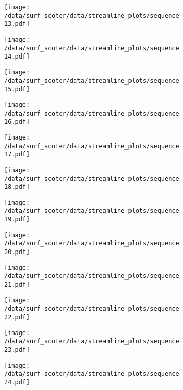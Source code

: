 \begin{figure}[h]
	\begin{subfigure}[t]{0.5\textwidth}
		\centering
		\texttt{[image: /data/surf\_scoter/data/streamline\_plots/sequence13.pdf]}
	\end{subfigure}%
	\begin{subfigure}[t]{0.5\textwidth}
		\centering
		\texttt{[image: /data/surf\_scoter/data/streamline\_plots/sequence14.pdf]}
	\end{subfigure}
	\begin{subfigure}[t]{0.5\textwidth}
		\centering
		\texttt{[image: /data/surf\_scoter/data/streamline\_plots/sequence15.pdf]}
	\end{subfigure}%
	\begin{subfigure}[t]{0.5\textwidth}
		\centering
		\texttt{[image: /data/surf\_scoter/data/streamline\_plots/sequence16.pdf]}
	\end{subfigure}
	\begin{subfigure}[t]{0.5\textwidth}
		\centering
		\texttt{[image: /data/surf\_scoter/data/streamline\_plots/sequence17.pdf]}
	\end{subfigure}%
	\begin{subfigure}[t]{0.5\textwidth}
		\centering
		\texttt{[image: /data/surf\_scoter/data/streamline\_plots/sequence18.pdf]}
	\end{subfigure}
\end{figure}

\begin{figure}[h]
	\begin{subfigure}[t]{0.5\textwidth}
		\centering
		\texttt{[image: /data/surf\_scoter/data/streamline\_plots/sequence19.pdf]}
	\end{subfigure}%
	\begin{subfigure}[t]{0.5\textwidth}
		\centering
		\texttt{[image: /data/surf\_scoter/data/streamline\_plots/sequence20.pdf]}
	\end{subfigure}
	\begin{subfigure}[t]{0.5\textwidth}
		\centering
		\texttt{[image: /data/surf\_scoter/data/streamline\_plots/sequence21.pdf]}
	\end{subfigure}%
	\begin{subfigure}[t]{0.5\textwidth}
		\centering
		\texttt{[image: /data/surf\_scoter/data/streamline\_plots/sequence22.pdf]}
	\end{subfigure}
	\begin{subfigure}[t]{0.5\textwidth}
		\centering
		\texttt{[image: /data/surf\_scoter/data/streamline\_plots/sequence23.pdf]}
	\end{subfigure}%
	\begin{subfigure}[t]{0.5\textwidth}
		\centering
		\texttt{[image: /data/surf\_scoter/data/streamline\_plots/sequence24.pdf]}
	\end{subfigure}
\end{figure}
